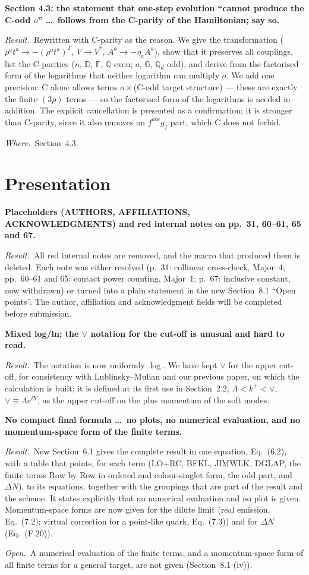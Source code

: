 \documentclass[a4paper,11pt]{article}
\def\mf#1{\mathbb{#1}}
\newcommand{\point}[1]{\par\medskip\noindent\textbf{#1}\par}
\newcommand{\result}{\par\noindent\emph{Result.}\ }
\newcommand{\where}{\par\noindent\emph{Where.}\ }
\newcommand{\open}{\par\noindent\emph{Open.}\ }
\begin{document}
\point{Section 4.3: the statement that one-step evolution ``cannot produce the C-odd $o$'' \dots\ follows from the C-parity of the Hamiltonian; say so.}
\result Rewritten with C-parity as the reason. We give the transformation ($\rho^at^a\to-(\rho^at^a)^T$, $V\to V^*$, $A^a\to-\eta_aA^a$), show that it preserves all couplings, list the C-parities ($n$, $\mf D$, $\mf F$, $\mf Q$ even; $o$, $\mf G$, $\mf Q_d$ odd), and derive from the factorised form of the logarithms that neither logarithm can multiply $o$. We add one precision: C alone allows terms $o\times$(C-odd target structure) --- these are exactly the finite $(3\rho)$ terms --- so the factorised form of the logarithms is needed in addition. The explicit cancellation is presented as a confirmation; it is stronger than C-parity, since it also removes an $f^{abc}g_f$ part, which C does not forbid.
\where Section~4.3.

\section*{Presentation}

\point{Placeholders (AUTHORS, AFFILIATIONS, ACKNOWLEDGMENTS) and red internal notes on pp.~31, 60--61, 65 and 67.}
\result All red internal notes are removed, and the macro that produced them is deleted. Each note was either resolved (p.~31: collinear cross-check, Major~4; pp.~60--61 and 65: contact power counting, Major~1; p.~67: inclusive constant, now withdrawn) or turned into a plain statement in the new Section~8.1 ``Open points''. The author, affiliation and acknowledgment fields will be completed before submission.

\point{Mixed log/ln; the $\vee$ notation for the cut-off is unusual and hard to read.}
\result The notation is now uniformly $\log$. We have kept $\vee$ for the upper cut-off, for consistency with Lublinsky--Mulian and our previous paper, on which the calculation is built; it is defined at its first use in Section~2.2, $\Lambda<k^+<\vee$, $\vee\equiv\Lambda e^{\delta Y}$, as the upper cut-off on the plus momentum of the soft modes.

\point{No compact final formula \dots\ no plots, no numerical evaluation, and no momentum-space form of the finite terms.}
\result New Section~6.1 gives the complete result in one equation, Eq.~(6.2), with a table that points, for each term (LO$+$RC, BFKL, JIMWLK, DGLAP, the finite terms Row by Row in ordered and colour-singlet form, the odd part, and $\Delta N$), to its equations, together with the groupings that are part of the result and the scheme. It states explicitly that no numerical evaluation and no plot is given. Momentum-space forms are now given for the dilute limit (real emission, Eq.~(7.2); virtual correction for a point-like quark, Eq.~(7.3)) and for $\Delta N$ (Eq.~(F.20)).
\open A numerical evaluation of the finite terms, and a momentum-space form of all finite terms for a general target, are not given (Section~8.1 (iv)).
\end{document}
